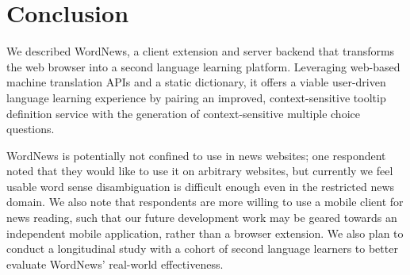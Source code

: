 \section{Conclusion}
\label{sec:conclusion}

We described WordNews, a client extension and server backend that
transforms the web browser into a second language learning platform.
Leveraging web-based machine translation APIs and a static dictionary,
it offers a viable user-driven language learning experience by pairing
an improved, context-sensitive tooltip definition service with the
generation of context-sensitive multiple choice questions.

WordNews is potentially not confined to use in news websites; one
respondent noted that they would like to use it on arbitrary websites,
but currently we feel usable word sense disambiguation is difficult
enough even in the restricted news domain.  We also note that
respondents are more willing to use a mobile client for news reading,
such that our future development work may be geared towards an
independent mobile application, rather than a browser extension.  We
also plan to conduct a longitudinal study with a cohort of second
language learners to better evaluate WordNews' real-world effectiveness.

